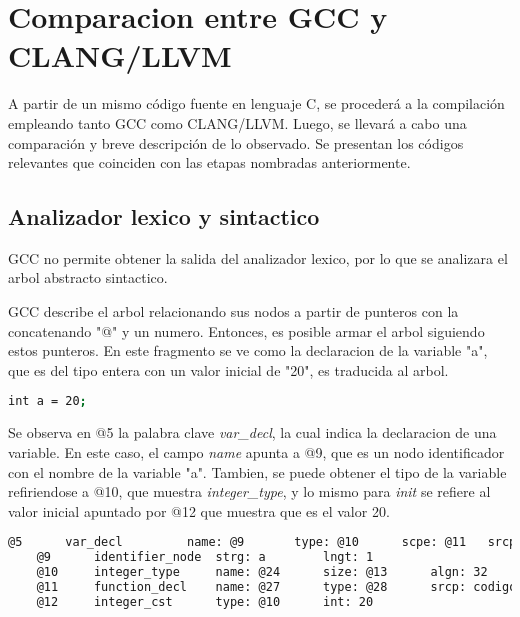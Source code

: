 \chapter{Comparacion entre GCC y CLANG/LLVM}

A partir de un mismo código fuente en lenguaje C, 
se procederá a la compilación empleando tanto GCC como CLANG/LLVM. 
Luego, se llevará a cabo una comparación y breve descripción de lo
observado. Se presentan los códigos relevantes que coinciden 
con las etapas nombradas anteriormente.

\section{Analizador lexico y sintactico}
GCC no permite obtener la salida del analizador lexico, por lo que se analizara 
el arbol abstracto sintactico. 

GCC describe el arbol relacionando sus nodos a partir de punteros con la concatenando 
"@" y un numero. Entonces, es posible armar el arbol siguiendo estos punteros. 
En este fragmento se ve como la declaracion de la variable "a", que es del tipo entera con 
un valor inicial de "20", es traducida al arbol.

\begin{lstlisting}[label=comandoC, caption= Fragmento del codigo fuente del archivo codigo-ejemplo.c \cite{repositorio} para GCC., language=bash]
    int a = 20;      \end{lstlisting}

Se observa en @5 la palabra clave \emph{var\_decl}, la cual indica la declaracion de una variable. En este 
caso, el campo \emph{name} apunta a @9, que es un nodo identificador con el nombre de la variable "a". 
Tambien, se puede obtener el tipo de la variable refiriendose a @10, que muestra \emph{integer\_type}, y lo 
mismo para \emph{init} se refiere al valor inicial apuntado por @12 que muestra que es el valor 20.

\begin{lstlisting}[label=comandoC, caption= Fragmento del arbol de GCC del archivo codigo-ejemplo.c.005t.original \cite{repositorio} para GCC., language=bash]
    @5      var_decl         name: @9       type: @10      scpe: @11   srcp: codigo-ejemplo.c:5      init: @12     
    @9      identifier_node  strg: a        lngt: 1       
    @10     integer_type     name: @24      size: @13      algn: 32      prec: 32       sign: signed   min : @25     max : @26     
    @11     function_decl    name: @27      type: @28      srcp: codigo-ejemplo.c:3      
    @12     integer_cst      type: @10      int: 20    \end{lstlisting}

